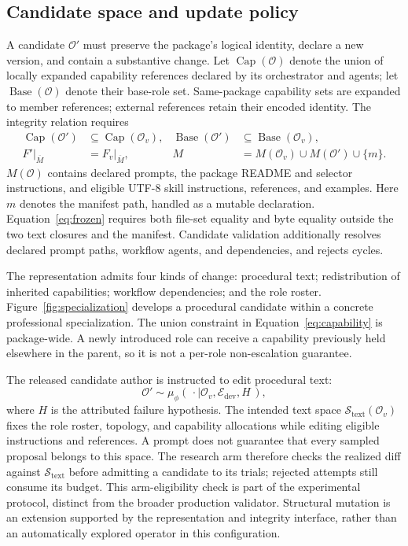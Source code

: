 \subsection{Candidate space and update policy}
A candidate $\mathcal O'$ must preserve the package's logical identity, declare a new version, and contain a substantive change. Let $\operatorname{Cap}(\mathcal O)$ denote the union of locally expanded capability references declared by its orchestrator and agents; let $\operatorname{Base}(\mathcal O)$ denote their base-role set. Same-package capability sets are expanded to member references; external references retain their encoded identity. The integrity relation requires
\begin{align}
\operatorname{Cap}(\mathcal O')&\subseteq\operatorname{Cap}(\mathcal O_v),
&
\operatorname{Base}(\mathcal O')&\subseteq\operatorname{Base}(\mathcal O_v),
\label{eq:capability}\\
F'|_{\overline{M}}&=F_v|_{\overline{M}},
&
M&=M(\mathcal O_v)\cup M(\mathcal O')\cup\{m\}.
\label{eq:frozen}
\end{align}
$M(\mathcal O)$ contains declared prompts, the package README and selector instructions, and eligible UTF-8 skill instructions, references, and examples. Here $m$ denotes the manifest path, handled as a mutable declaration. Equation~\ref{eq:frozen} requires both file-set equality and byte equality outside the two text closures and the manifest. Candidate validation additionally resolves declared prompt paths, workflow agents, and dependencies, and rejects cycles.

The representation admits four kinds of change: procedural text; redistribution of inherited capabilities; workflow dependencies; and the role roster. Figure~\ref{fig:specialization} develops a procedural candidate within a concrete professional specialization. The union constraint in Equation~\ref{eq:capability} is package-wide. A newly introduced role can receive a capability previously held elsewhere in the parent, so it is not a per-role non-escalation guarantee.

The released candidate author is instructed to edit procedural text:
\begin{equation}
\mathcal O'\sim
  \mu_{\phi}(\,\cdot\mid\mathcal O_v,\mathcal E_{\mathrm{dev}},H\,),
\label{eq:mutation}
\end{equation}
where $H$ is the attributed failure hypothesis. The intended text space $\mathcal S_{\mathrm{text}}(\mathcal O_v)$ fixes the role roster, topology, and capability allocations while editing eligible instructions and references. A prompt does not guarantee that every sampled proposal belongs to this space. The research arm therefore checks the realized diff against $\mathcal S_{\mathrm{text}}$ before admitting a candidate to its trials; rejected attempts still consume its budget. This arm-eligibility check is part of the experimental protocol, distinct from the broader production validator. Structural mutation is an extension supported by the representation and integrity interface, rather than an automatically explored operator in this configuration.

